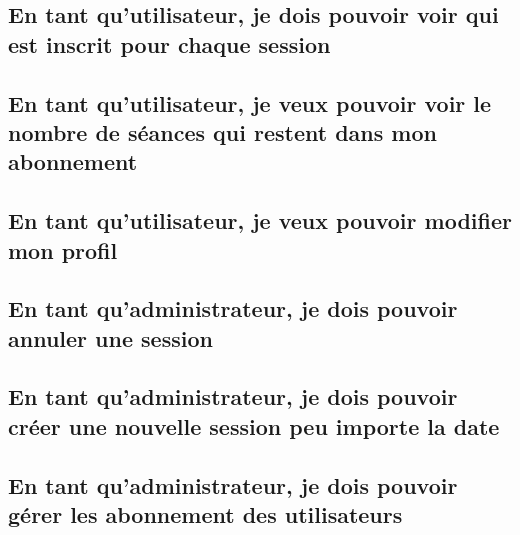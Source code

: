 	\vspace{\baselineskip}
	\subsection{En tant qu’utilisateur, je dois pouvoir voir qui est inscrit pour chaque session}
		
	
	\newpage
	\subsection{En tant qu’utilisateur, je veux pouvoir voir le nombre de séances qui restent dans mon abonnement}
		

	\vspace{\baselineskip}	
	\subsection{En tant qu'utilisateur, je veux pouvoir modifier mon profil}
		

	\vspace{\baselineskip}
	\subsection{En tant qu’administrateur, je dois pouvoir annuler une session}
		

	\newpage
	\subsection{En tant qu'administrateur, je dois pouvoir créer une nouvelle session peu importe la date}
		

	\newpage
	\subsection{En tant qu'administrateur, je dois pouvoir gérer les abonnement des utilisateurs}
		
